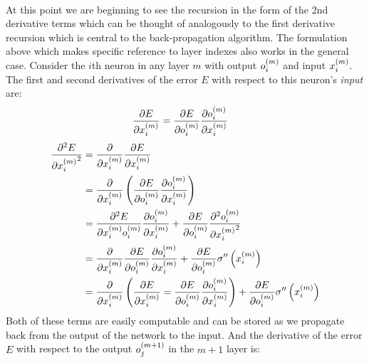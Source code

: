 \\[5pt]
At this point we are beginning to see the recursion in the form of the 2nd derivative terms which can be thought of analogously to the first derivative recursion which is central to the back-propagation algorithm. The formulation above which makes specific reference to layer indexes also works in the general case. Consider the $i$th neuron in any layer $m$ with output $o_{i}^{(m)}$ and input $x_{i}^{(m)}$. The first and second derivatives of the error $E$ with respect to this neuron's \textit{input} are: 
\begin{align}
\pdv{E}{x_{i}^{(m)}} &= 
\pdv{E}{o_{i}^{(m)}}
\pdv{o_{i}^{(m)}}{x_{i}^{(m)}}\label{dedx_general}
\end{align}
\begin{align}
\pdv[2]{E}{{x_{i}^{(m)}}} &= 
\pdv{}{{x_{i}^{(m)}}}
\pdv{E}{{x_{i}^{(m)}}} 
\\
&= \pdv{}{x_{i}^{(m)}}
\left(
\pdv{E}{o_{i}^{(m)}}
\pdv{o_{i}^{(m)}}{x_{i}^{(m)}}
\right)
\\
&= \pdv{{^2}E}{{x_{i}^{(m)}}{o_{i}^{(m)}}}\pdv{o_{i}^{(m)}}{x_{i}^{(m)}}
+
\pdv{E}{o_{i}^{(m)}}\pdv[2]{{o_{i}^{(m)}}}{{x_{i}^{(m)}}}
\\
&=\pdv{}{x_{i}^{(m)}}\pdv{E}{o_{i}^{(m)}}\pdv{o_{i}^{(m)}}{x_{i}^{(m)}}
+
\pdv{E}{o_{i}^{(m)}}\sigma^{\prime\prime}\left(x_{i}^{(m)}\right)
\\
&=\pdv{}{x_{i}^{(m)}}
\left(\pdv{E}{{x_{i}^{(m)}}} = \pdv{E}{o_{i}^{(m)}}\pdv{o_{i}^{(m)}}{x_{i}^{(m)}}\right)
+
\pdv{E}{o_{i}^{(m)}}\sigma^{\prime\prime}\left(x_{i}^{(m)}\right)
\end{align}
Both of these terms are easily computable and can be stored as we propagate back from the output of the network to the input. And the derivative of the error $E$ with respect to the output $o_{j}^{(m+1)}$ in the $m+1$ layer is:
